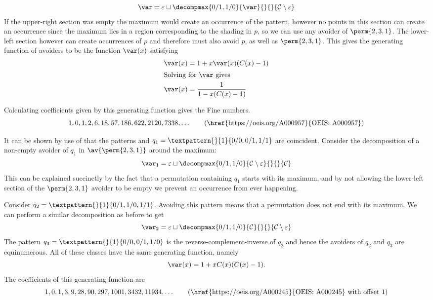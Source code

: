 \begin{equation*}
    \scriptvar = \varepsilon \sqcup
\decompmax{0/1,1/0}{\scriptvar}{}{}{\mathcal{C}\setminus\varepsilon}
\end{equation*}
If the upper-right section was empty the maximum would create an
occurrence of the pattern, however no points in this section can create
an occurrence since the maximum lies in a region corresponding to the
shading in \(p\), so we can use any avoider of \(\perm{2,3,1}\). The lower-left
section however can create occurrences
of \(p\) and therefore must also avoid \(p\), as well as \(\perm{2,3,1}\).
This gives the generating function of avoiders to be the function \(\var(x)\)
satisfying
\begin{align*}
    \var(x) &= 1 + x\var(x)(C(x)-1) \\
    \shortintertext{Solving for \(\var\) gives}
    \var(x) &= \frac{1}{1-x(C(x)-1)}
\end{align*}

\noindent
Calculating coefficients given by this generating function gives the Fine
numbers.
\begin{equation*}
    1, 0, 1, 2, 6, 18, 57, 186, 622, 2120, 7338,\dotsc
\tag{\href{https://oeis.org/A000957}{OEIS: A000957}}
\end{equation*}

\nextvar[\varfine]
It can be shown by use of  that the patterns
 and \(q_1 = \textpattern{}{1}{0/0,0/1,1/1}\) are
coincident. Consider the decomposition of a non-empty avoider of \(q_1\) in
\(\av{\perm{2,3,1}}\) around the maximum:
\begin{equation*}
    \scriptvar_1 =\varepsilon \sqcup
\decompmax{0/1,1/0}{\mathcal{C}\setminus\varepsilon}{}{}{\mathcal{C}}
\end{equation*}
This can be explained succinctly by the fact that a permutation containing
\(q_1\) starts with its maximum, and by not allowing the lower-left section of the
\(\perm{2,3,1}\) avoider to be empty we prevent an occurrence from ever
happening.

Consider \(q_2 = \textpattern{}{1}{0/1,1/0,1/1}\). Avoiding this pattern
means that a permutation does not end with its maximum. We can perform a
similar
decomposition as before to get
\begin{equation*}
    \mathcal{\var}_2 =\varepsilon \sqcup
\decompmax{0/1,1/0}{\mathcal{C}}{}{}{\mathcal{C}\setminus\varepsilon}
\end{equation*}
The pattern \(q_3 = \textpattern{}{1}{0/0,0/1,1/0}\) is the reverse-complement-inverse
of \(q_2\) and hence the avoiders of \(q_2\) and \(q_3\) are equinumerous.
All of these classes have the same generating function, namely
\begin{equation}
    \var(x) = 1 + xC(x)(C(x)-1). \label{eqn:maxlgen}
\end{equation}
The coefficients of this generating function are
\begin{equation*}
    1, 0, 1, 3, 9, 28, 90, 297, 1001, 3432, 11934,\dotsc
\tag{\href{https://oeis.org/A000245}{OEIS: A000245} with offset \(1\)}
\end{equation*}

